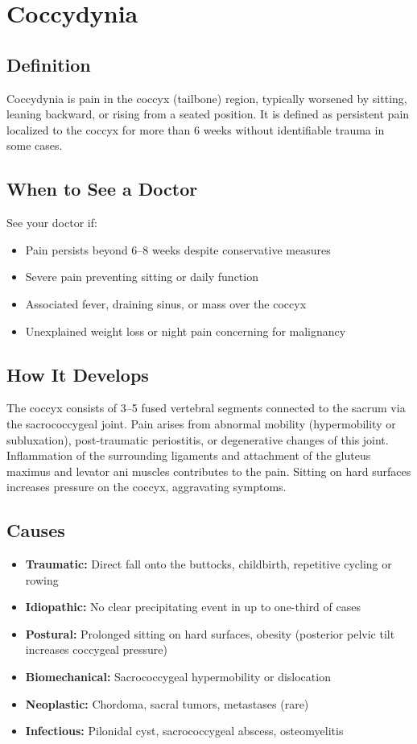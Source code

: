\chapter{Coccydynia}

\section*{Definition}
Coccydynia is pain in the coccyx (tailbone) region, typically worsened by sitting, leaning backward, or rising from a seated position. It is defined as persistent pain localized to the coccyx for more than 6 weeks without identifiable trauma in some cases.

\section*{When to See a Doctor}
See your doctor if:
\begin{itemize}
  \item Pain persists beyond 6--8 weeks despite conservative measures
  \item Severe pain preventing sitting or daily function
  \item Associated fever, draining sinus, or mass over the coccyx
  \item Unexplained weight loss or night pain concerning for malignancy
\end{itemize}

\section*{How It Develops}
The coccyx consists of 3--5 fused vertebral segments connected to the sacrum via the sacrococcygeal joint. Pain arises from abnormal mobility (hypermobility or subluxation), post-traumatic periostitis, or degenerative changes of this joint. Inflammation of the surrounding ligaments and attachment of the gluteus maximus and levator ani muscles contributes to the pain. Sitting on hard surfaces increases pressure on the coccyx, aggravating symptoms.

\section*{Causes}
\begin{itemize}
  \item \textbf{Traumatic:} Direct fall onto the buttocks, childbirth, repetitive cycling or rowing
  \item \textbf{Idiopathic:} No clear precipitating event in up to one-third of cases
  \item \textbf{Postural:} Prolonged sitting on hard surfaces, obesity (posterior pelvic tilt increases coccygeal pressure)
  \item \textbf{Biomechanical:} Sacrococcygeal hypermobility or dislocation
  \item \textbf{Neoplastic:} Chordoma, sacral tumors, metastases (rare)
  \item \textbf{Infectious:} Pilonidal cyst, sacrococcygeal abscess, osteomyelitis
\end{itemize}

